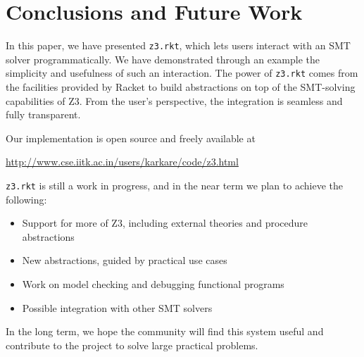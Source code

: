 \section{Conclusions and Future Work}

In this paper, we have presented \texttt{z3.rkt}, which lets users interact with
an SMT solver programmatically. We have demonstrated through an example the
simplicity and usefulness of such an interaction. The power of \texttt{z3.rkt}
comes from the facilities provided by Racket to build abstractions on top of the
SMT-solving capabilities of Z3. From the user's perspective, the integration is
seamless and fully transparent.

Our implementation is open source and freely available at
\begin{center}
\url{http://www.cse.iitk.ac.in/users/karkare/code/z3.html}
\end{center}

\texttt{z3.rkt} is still a work in progress, and in the near term we plan to
achieve the following:

\begin{itemize}
\item Support for more of Z3, including external theories and procedure
  abstractions
\item New abstractions, guided by practical use cases
\item Work on model checking and debugging functional programs
\item Possible integration with other SMT solvers
\end{itemize}

In the long term, we hope the community will find this system useful and
contribute to the project to solve large practical problems.
